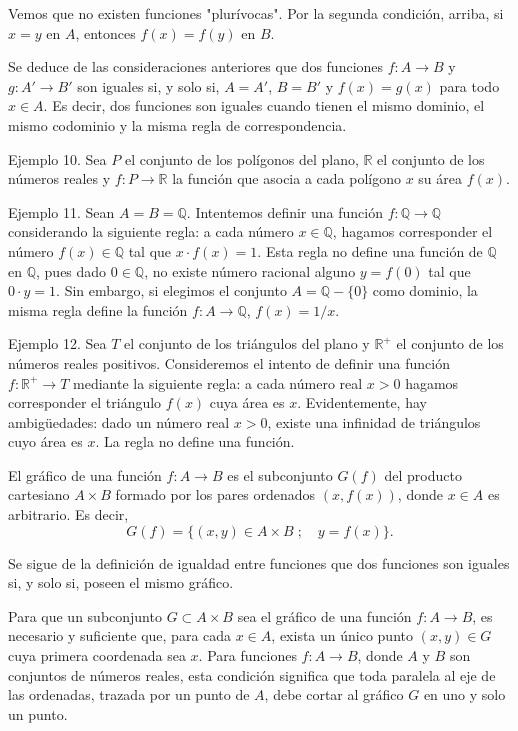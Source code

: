 \documentclass[12pt,oneside]{book}
\begin{document}
Vemos que no existen funciones "plurívocas". Por la segunda condición, arriba, si \(x = y\) en \(A\), entonces \(f(x) = f(y)\) en \(B\).

Se deduce de las consideraciones anteriores que dos funciones \(f: A \to B\) y \(g: A' \to B'\) son iguales si, y solo si, \(A = A'\), \(B = B'\) y \(f(x) = g(x)\) para todo \(x \in A\). Es decir, dos funciones son iguales cuando tienen el mismo dominio, el mismo codominio y la misma regla de correspondencia.

Ejemplo 10. Sea \(P\) el conjunto de los polígonos del plano, \(\mathbb{R}\) el conjunto de los números reales y \(f: P \to \mathbb{R}\) la función que asocia a cada polígono \(x\) su área \(f(x)\).

Ejemplo 11. Sean \(A = B = \mathbb{Q}\). Intentemos definir una función \(f: \mathbb{Q} \to \mathbb{Q}\) considerando la siguiente regla: a cada número \(x \in \mathbb{Q}\), hagamos corresponder el número \(f(x) \in \mathbb{Q}\) tal que \(x \cdot f(x) = 1\). Esta regla no define una función de \(\mathbb{Q}\) en \(\mathbb{Q}\), pues dado \(0 \in \mathbb{Q}\), no existe número racional alguno \(y = f(0)\) tal que \(0 \cdot y = 1\). Sin embargo, si elegimos el conjunto \(A = \mathbb{Q} - \{0\}\) como dominio, la misma regla define la función \(f: A \to \mathbb{Q}\), \(f(x) = 1/x\).

Ejemplo 12. Sea \(T\) el conjunto de los triángulos del plano y \(\mathbb{R}^+\) el conjunto de los números reales positivos. Consideremos el intento de definir una función \(f: \mathbb{R}^+ \to T\) mediante la siguiente regla: a cada número real \(x > 0\) hagamos corresponder el triángulo \(f(x)\) cuya área es \(x\). Evidentemente, hay ambigüedades: dado un número real \(x > 0\), existe una infinidad de triángulos cuyo área es \(x\). La regla no define una función.

El gráfico de una función \(f: A \to B\) es el subconjunto \(G(f)\) del producto cartesiano \(A \times B\) formado por los pares ordenados \((x, f(x))\), donde \(x \in A\) es arbitrario. Es decir,
\[
G(f) = \{(x, y) \in A \times B \; ; \quad y = f(x)\}.
\]

Se sigue de la definición de igualdad entre funciones que dos funciones son iguales si, y solo si, poseen el mismo gráfico.

Para que un subconjunto \(G \subset A \times B\) sea el gráfico de una función \(f: A \to B\), es necesario y suficiente que, para cada \(x \in A\), exista un único punto \((x, y) \in G\) cuya primera coordenada sea \(x\). Para funciones \(f: A \to B\), donde \(A\) y \(B\) son conjuntos de números reales, esta condición significa que toda paralela al eje de las ordenadas, trazada por un punto de \(A\), debe cortar al gráfico \(G\) en uno y solo un punto.
\end{document}
